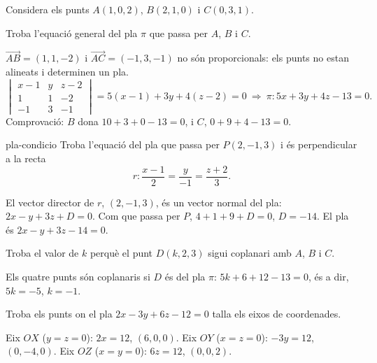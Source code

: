 Considera els punts $A(1,0,2)$, $B(2,1,0)$ i $C(0,3,1)$.

\begin{apartats}

Troba l'equació general del pla $\pi$ que passa per $A$, $B$ i $C$.

\begin{solucio}
$\overrightarrow{AB}=(1,1,-2)$ i $\overrightarrow{AC}=(-1,3,-1)$ no són proporcionals: els punts no estan
alineats i determinen un pla.
\[
\begin{vmatrix}x-1&y&z-2\\1&1&-2\\-1&3&-1\end{vmatrix}=5(x-1)+3y+4(z-2)=0
\ \Longrightarrow\ \pi\colon 5x+3y+4z-13=0.
\]
Comprovació: $B$ dona $10+3+0-13=0$, i $C$, $0+9+4-13=0$.
\end{solucio}

\begin{tria}{pla-condicio}
Troba l'equació del pla que passa per $P(2,-1,3)$ i és perpendicular a la recta
\[
r\colon\frac{x-1}{2}=\frac{y}{-1}=\frac{z+2}{3}.
\]

\begin{solucio}
El vector director de $r$, $(2,-1,3)$, és un vector normal del pla: $2x-y+3z+D=0$. Com que passa per
$P$, $4+1+9+D=0$, $D=-14$. El pla és $2x-y+3z-14=0$.
\end{solucio}

Troba el valor de $k$ perquè el punt $D(k,2,3)$ sigui coplanari amb $A$, $B$ i $C$.

\begin{solucio}
Els quatre punts són coplanaris si $D$ és del pla $\pi$: $5k+6+12-13=0$, és a dir, $5k=-5$, $k=-1$.
\end{solucio}
\end{tria}

\begin{nomesllarg}
Troba els punts on el pla $2x-3y+6z-12=0$ talla els eixos de coordenades.

\begin{solucio}
Eix $OX$ ($y=z=0$): $2x=12$, $(6,0,0)$. Eix $OY$ ($x=z=0$): $-3y=12$, $(0,-4,0)$. Eix $OZ$ ($x=y=0$):
$6z=12$, $(0,0,2)$.
\end{solucio}
\end{nomesllarg}

\end{apartats}

